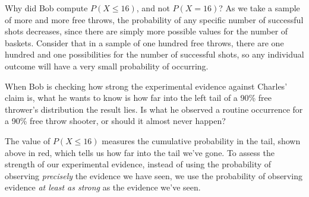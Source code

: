 Why did Bob compute $P(X \leq 16)$, and not $P(X = 16)$? As we take a sample of more and more free throws, the probability of any specific number of successful shots decreases, since there are simply more possible values for the number of baskets. Consider that in a sample of one hundred free throws, there are one hundred and one possibilities for the number of successful shots, so any individual outcome will have a very small probability of occurring.

When Bob is checking how strong the experimental evidence against Charles' claim is, what he wants to know is how far into the left tail of a 90\% free thrower's distribution the result lies. Is what he observed a routine occurrence for a 90\% free throw shooter, or should it almost never happen?

\begin{center}
\end{center}



The value of $P(X \leq 16)$ measures the cumulative probability in the tail, shown above in red, which tells us how far into the tail we've gone. To assess the strength of our experimental evidence, instead of using the probability of observing \emph{precisely} the evidence we have seen, we use the probability of observing evidence \emph{at least as strong} as the evidence we've seen.

